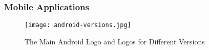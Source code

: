 


\subsubsection{Mobile Applications}
\label{mobileapplicationsstateoftheart}

\begin{figure}[ht]
  \centering
      \texttt{[image: android-versions.jpg]}
  \caption[Android Logo and Version Icons]{The Main Android Logo and Logos for Different Versions\cite{androidlogowithversionsresource}}
  \label{fig:androidlogo}
\end{figure}

